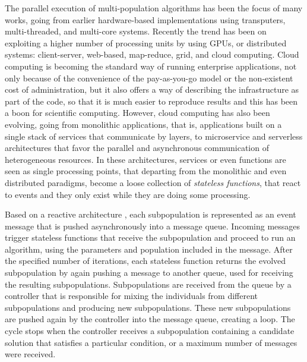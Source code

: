 \documentclass[review]{elsarticle}
\begin{document}
The parallel execution of multi-population algorithms has been the focus of many
works,  going from earlier hardware-based implementations using transputers,
multi-threaded, and multi-core systems. Recently the trend has been on
exploiting a higher number of processing units by using GPUs, or distributed
systems: client-server, web-based, map-reduce,  grid, and cloud computing. Cloud
computing is becoming the standard way of running enterprise applications, not
only because of the convenience of the pay-as-you-go model or the non-existent
cost of administration, but it also offers a way of describing the
infrastructure as part of the code, so that it is much easier to reproduce
results and this has been a boon for scientific computing.  However,  cloud computing
has also been evolving, going from monolithic applications, that is,
applications built on a single stack of services that communicate by layers, to
microservice and serverless architectures that favor the parallel and
asynchronous communication of heterogeneous resources. In these architectures,
services or even functions are seen as single processing points, that departing
from the monolithic and even distributed paradigms, become a loose collection of 
{\em stateless functions}, that react to events and they only exist while they 
are doing some processing. 


Based on a reactive architecture \cite{guervos2018introducing} , each subpopulation is represented as an event message that is pushed asynchronously into a message queue. Incoming messages trigger stateless functions that receive the subpopulation and proceed to run an algorithm, using the parameters and population included in the message. After the specified number of iterations, each stateless function returns the evolved subpopulation by again pushing a message to another queue, used for receiving the resulting subpopulations. Subpopulations are received from the queue by a controller that is responsible for mixing the individuals from different subpopulations and producing new subpopulations. These new subpopulations are pushed again by the controller into the message queue, creating a loop. The cycle stops when the controller receives a subpopulation containing a candidate solution that satisfies a particular condition, or a maximum number of messages were received. 
\end{document}
